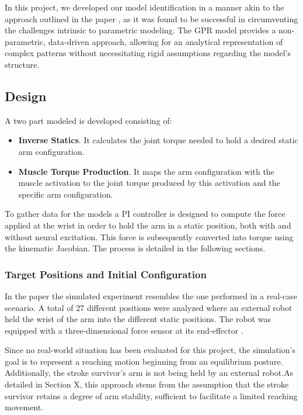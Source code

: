 In this project, we developed our model identification in a manner akin to the approach outlined in the paper \cite{QSC}, as it was found to be successful in circumventing the challenges intrinsic to parametric modeling. The GPR model provides a non-parametric, data-driven approach, allowing for an analytical representation of complex patterns without necessitating rigid assumptions regarding the model's structure.

\subsection{Design}

 A two part modeled is developed consisting of:

 \begin{itemize}
     \item \textbf{Inverse Statics}. It calculates the joint torque needed to hold a desired static arm configuration.
     \item \textbf{Muscle Torque Production}. It maps the arm configuration with the muscle activation to the joint torque produced by this activation and the specific arm configuration. 
 \end{itemize}

To gather data for the models a PI controller is designed to compute the force applied at the wrist in order to hold the arm in a static position, both with and without neural excitation. This force is subsequently converted into torque using the kinematic Jacobian. The process is detailed in the following sections. 

 \subsubsection{Target Positions and Initial Configuration}

 In the paper \cite{QSC} the simulated experiment resembles the one performed in a real-case scenario. A total of 27 different positions were analyzed where an external robot held the wrist of the arm into the different static positions. The robot was equipped with a three-dimensional force sensor at its end-effector \cite{HSAC}. 
 
 Since no real-world situation has been evaluated for this project, the simulation's goal is to represent a reaching motion beginning from an equilibrium posture. Additionally, the stroke survivor's arm is not being held by an external robot.As detailed in Section X, this approach stems from the assumption that the stroke survivor retains a degree of arm stability, sufficient to facilitate a limited reaching movement.  

